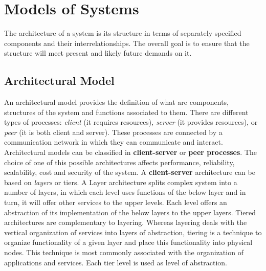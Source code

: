 \documentclass[11pt,a4paper]{article}
\begin{document}
\newpage

\section{Models of Systems}
The architecture of a system is its structure in terms of separately specified components and their interrelationships. The overall goal is to ensure that the structure will meet present and likely future demands on it.
\subsection{Architectural Model}
An architectural model provides the definition of what are components, structures of the system and functions associated to them. There are different types of processes: \textit{client} (it requires resources), \textit{server} (it provides resources), or \textit{peer} (it is both client and server). These processes are connected by a communication network in which they can communicate and interact. 
Architectural models can be classified in \textbf{client-server} or \textbf{peer processes}. The choice of one of this possible architectures affects performance, reliability, scalability, cost and security of the system.
A \textbf{client-server} architecture can be based on \textit{layers} or tiers.
A Layer architecture splits complex system into a number of layers, in which each level uses functions of the below layer and in turn, it will offer other services to the upper levels. Each level offers an abstraction of its implementation of the below layers to the upper layers.
Tiered architectures are complementary to layering. Whereas layering deals with the vertical organization of services into layers of abstraction, tiering is a technique to organize functionality of a given layer and place this functionality into physical nodes. This technique is most commonly associated with the organization of applications and services. Each tier level is used as level of abstraction.
\end{document}
